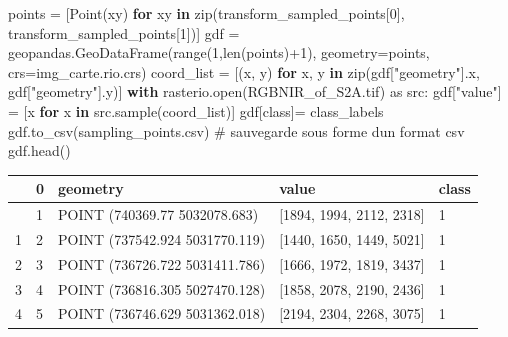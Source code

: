 \documentclass[
  11pt,
  letterpaper,
  open=any,
  twoside=false,
  french]{scrbook}
\newenvironment{Shaded}{\begin{snugshade}}{\end{snugshade}}
\newcommand{\BuiltInTok}[1]{\textcolor[rgb]{0.00,0.23,0.31}{#1}}
\newcommand{\CommentTok}[1]{\textcolor[rgb]{0.37,0.37,0.37}{#1}}
\newcommand{\ControlFlowTok}[1]{\textcolor[rgb]{0.00,0.23,0.31}{\textbf{#1}}}
\newcommand{\DecValTok}[1]{\textcolor[rgb]{0.68,0.00,0.00}{#1}}
\newcommand{\ImportTok}[1]{\textcolor[rgb]{0.00,0.46,0.62}{#1}}
\newcommand{\KeywordTok}[1]{\textcolor[rgb]{0.00,0.23,0.31}{\textbf{#1}}}
\newcommand{\NormalTok}[1]{\textcolor[rgb]{0.00,0.23,0.31}{#1}}
\newcommand{\OperatorTok}[1]{\textcolor[rgb]{0.37,0.37,0.37}{#1}}
\newcommand{\StringTok}[1]{\textcolor[rgb]{0.13,0.47,0.30}{#1}}
\begin{document}
\begin{Shaded}
\begin{Highlighting}[]
\NormalTok{points }\OperatorTok{=}\NormalTok{ [Point(xy) }\ControlFlowTok{for}\NormalTok{ xy }\KeywordTok{in} \BuiltInTok{zip}\NormalTok{(transform\_sampled\_points[}\DecValTok{0}\NormalTok{], transform\_sampled\_points[}\DecValTok{1}\NormalTok{])]}
\NormalTok{gdf }\OperatorTok{=}\NormalTok{ geopandas.GeoDataFrame(}\BuiltInTok{range}\NormalTok{(}\DecValTok{1}\NormalTok{,}\BuiltInTok{len}\NormalTok{(points)}\OperatorTok{+}\DecValTok{1}\NormalTok{), geometry}\OperatorTok{=}\NormalTok{points, crs}\OperatorTok{=}\NormalTok{img\_carte.rio.crs)}
\NormalTok{coord\_list }\OperatorTok{=}\NormalTok{ [(x, y) }\ControlFlowTok{for}\NormalTok{ x, y }\KeywordTok{in} \BuiltInTok{zip}\NormalTok{(gdf[}\StringTok{"geometry"}\NormalTok{].x, gdf[}\StringTok{"geometry"}\NormalTok{].y)]}
\ControlFlowTok{with}\NormalTok{ rasterio.}\BuiltInTok{open}\NormalTok{(}\StringTok{\textquotesingle{}RGBNIR\_of\_S2A.tif\textquotesingle{}}\NormalTok{) }\ImportTok{as}\NormalTok{ src:}
\NormalTok{  gdf[}\StringTok{"value"}\NormalTok{] }\OperatorTok{=}\NormalTok{ [x }\ControlFlowTok{for}\NormalTok{ x }\KeywordTok{in}\NormalTok{ src.sample(coord\_list)]}
\NormalTok{gdf[}\StringTok{\textquotesingle{}class\textquotesingle{}}\NormalTok{]}\OperatorTok{=}\NormalTok{ class\_labels}
\NormalTok{gdf.to\_csv(}\StringTok{\textquotesingle{}sampling\_points.csv\textquotesingle{}}\NormalTok{) }\CommentTok{\# sauvegarde sous forme d\textquotesingle{}un format csv}
\NormalTok{gdf.head()}
\end{Highlighting}
\end{Shaded}

\begin{longtable}[]{@{}lllll@{}}
\toprule\noalign{}
& 0 & geometry & value & class \\
\midrule\noalign{}
\endhead
\bottomrule\noalign{}
\endlastfoot
0 & 1 & POINT (740369.77 5032078.683) & {[}1894, 1994, 2112, 2318{]} &
1 \\
1 & 2 & POINT (737542.924 5031770.119) & {[}1440, 1650, 1449, 5021{]} &
1 \\
2 & 3 & POINT (736726.722 5031411.786) & {[}1666, 1972, 1819, 3437{]} &
1 \\
3 & 4 & POINT (736816.305 5027470.128) & {[}1858, 2078, 2190, 2436{]} &
1 \\
4 & 5 & POINT (736746.629 5031362.018) & {[}2194, 2304, 2268, 3075{]} &
1 \\
\end{longtable}
\end{document}
